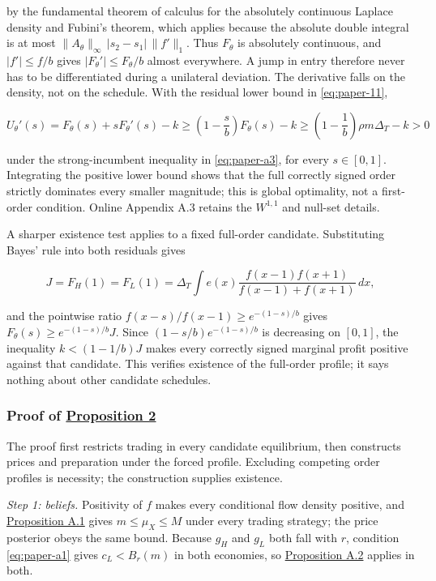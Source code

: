 \documentclass[
  12pt,
]{article}
\begin{document}
by the fundamental theorem of calculus for the absolutely continuous
Laplace density and Fubini's theorem, which applies because the absolute
double integral is at most \(\|A_\theta\|_\infty\,|s_2-s_1|\,\|f'\|_1\).
Thus \(F_\theta\) is absolutely continuous, and \(|f'|\le f/b\) gives
\(|F_\theta'|\le F_\theta/b\) almost everywhere. A jump in entry
therefore never has to be differentiated during a unilateral deviation.
The derivative falls on the density, not on the schedule. With the
residual lower bound in \eqref{eq:paper-11},

\[
U_\theta'(s)=F_\theta(s)+sF_\theta'(s)-k
\ge\left(1-\frac sb\right)F_\theta(s)-k
\ge\left(1-\frac1b\right)\rho m\Delta_T-k>0
\tag{A.6}\label{eq:paper-a-6}
\]

under the strong-incumbent inequality in \eqref{eq:paper-a3}, for every
\(s\in[0,1]\). Integrating the positive lower bound shows that the full
correctly signed order strictly dominates every smaller magnitude; this
is global optimality, not a first-order condition. Online Appendix A.3
retains the \(W^{1,1}\) and null-set details.

A sharper existence test applies to a fixed full-order candidate.
Substituting Bayes' rule into both residuals gives

\[
J=F_H(1)=F_L(1)
=\Delta_T\int e(x)\frac{f(x-1)f(x+1)}{f(x-1)+f(x+1)}\,dx,
\tag{A.7}\label{eq:paper-a-7}
\]

and the pointwise ratio \(f(x-s)/f(x-1)\ge e^{-(1-s)/b}\) gives
\(F_\theta(s)\ge e^{-(1-s)/b}J\). Since \((1-s/b)e^{-(1-s)/b}\) is
decreasing on \([0,1]\), the inequality \(k<(1-1/b)J\) makes every
correctly signed marginal profit positive against that candidate. This
verifies existence of the full-order profile; it says nothing about
other candidate schedules.

\subsubsection{\texorpdfstring{Proof of
\hyperref[result-proposition-2]{Proposition
2}}{Proof of Proposition 2}}\label{proof-of-proposition-2}

The proof first restricts trading in every candidate equilibrium, then
constructs prices and preparation under the forced profile. Excluding
competing order profiles is necessity; the construction supplies
existence.

\emph{Step 1: beliefs.} Positivity of \(f\) makes every conditional flow
density positive, and \hyperref[result-proposition-a-1]{Proposition A.1}
gives \(m\le\mu_X\le M\) under every trading strategy; the price
posterior obeys the same bound. Because \(g_H\) and \(g_L\) both fall
with \(r\), condition \eqref{eq:paper-a1} gives \(c_L<B_r(m)\) in both
economies, so \hyperref[result-proposition-a-2]{Proposition A.2} applies
in both.
\end{document}
